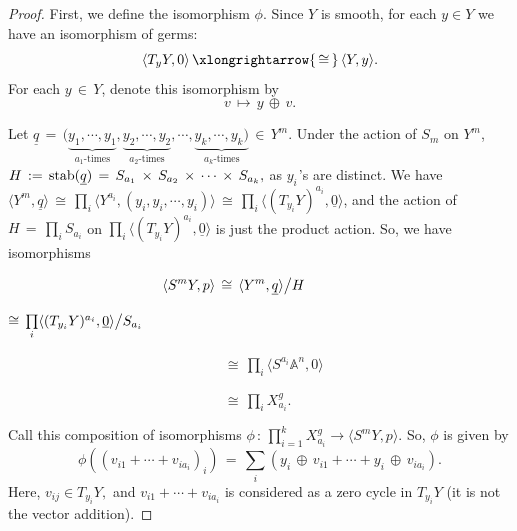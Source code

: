 \documentclass[12pt,reqno]{amsart}
\theoremstyle{definition}
\numberwithin{equation}{section}
\begin{document}
\begin{proof}
First, we define the isomorphism $\phi$.  Since $Y$ is smooth, for each $y\in Y$ we have an isomorphism of germs: 
$$ \langle T_{y}Y,0 \rangle\, \xlongrightarrow{\,\cong\,}\,\langle Y, y \rangle .$$ For each $ y\,\in\, Y$, denote this isomorphism by $$ v\, \longmapsto\, y\,\oplus\, v.$$

Let $ \underline{q}\,=\, (\underbrace{y_{1},\cdots,y_{1}}_{a_{1}\text{-times}}, \underbrace{y_{2},\cdots,y_{2}}_{a_{2}\text{-times}},\cdots, \underbrace{y_{k},\cdots,y_{k})}_{a_{k}\text{-times}}\,\in\, Y^{m}.$ Under the action of $S_{m}$ on $Y^{m}$, $ H\,:=\,\textnormal{stab}(\underline{q})\,=\,S_{a_{1}} \,\times\, S_{a_{2}}\,\times\, \cdots\, \times\, S_{a_{k}},$ as $y_{i} \hspace{1pt}$'s are distinct. 
We have $ \langle Y^{m}, \underline{q} \rangle \,\cong\,\underset{i} {\prod} \langle Y^{a_{i}}, (y_{i},y_{i}, \cdots, y_{i})\rangle \,\cong\, \underset{i} {\prod}\langle(T_{y_{i}}Y)^{a_{i}}, \underline{0}\rangle $, and the action of $ H\,=\, \underset{i} {\prod}S_{a_{i}}$ on $ \underset{i} {\prod} \langle (T_{y_{i}}Y)^{a_{i}}, \underline{0}\rangle$ is just the product action. So, we have isomorphisms

$$\hspace{-1.3cm} \langle S^{m}Y,p \rangle\, \cong\, \langle Y^{m}, \underline{q} \rangle \big{/}H$$

    \hspace{185pt}$ \cong\, \underset{i} {\prod} \langle (T_{y_{i}}Y)^{a_{i}}, \underline{0}\rangle\big{/}S_{a_{i}}$

    $ \hspace{185pt}\cong\, \underset{i} {\prod}\langle S^{a_{i}}\mathbb{A}^n,0 \rangle$

    $ \hspace{185pt}\cong\, \underset{i} {\prod}X_{a_{i}}^{g}$.
    
Call this composition of isomorphisms $\phi\,:\,\prod_{i=1}^{k} X_{a_{i}}^g\longrightarrow \langle S^{m}Y, p \rangle$.
So, $ \phi$ is given by 
\begin{equation}\label{phi}
    \phi ((v_{i1}+ \cdots + v_{ia_{i}})_{i})\,=\, \sum_{i}(y_{i}\,\oplus\, v_{i1}+ \cdots + y_{i}\,\oplus\, v_{ia_{i}}).
\end{equation} 
Here, $v_{ij}\in T_{y_{i}}Y,$ and $ v_{i1}+\cdots +v_{ia_{i}}$ is considered as a zero cycle in $ T_{y_{i}}Y$ (it is not the vector addition).






\end{proof}
\end{document}
